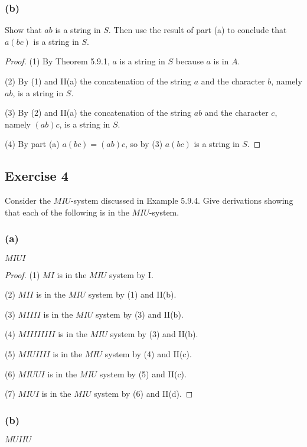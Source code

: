 \documentclass[14pt]{extarticle}
\begin{document}
\subsubsection{(b)}
Show that $ab$ is a string in $S$. Then use the result of part (a) to conclude that $a(bc)$ is a string in $S$.

\begin{proof}
    (1) By Theorem 5.9.1, $a$ is a string in $S$ because $a$ is in $A$.

    (2) By (1) and II(a) the concatenation of the string $a$ and the character $b$, namely $ab$, is a string in $S$.

    (3) By (2) and II(a) the concatenation of the string $ab$ and the character $c$, namely $(ab)c$, is a string in $S$.

    (4) By part (a) $a(bc) = (ab)c$, so by (3) $a(bc)$ is a string in $S$.
\end{proof}

\subsection{Exercise 4}
Consider the $M I U$-system discussed in Example 5.9.4. Give derivations showing that each of the following is in the $M I U$-system.

\subsubsection{(a)}
$M I U I$

\begin{proof}
    (1) $M I$ is in the $M I U$ system by I.

    (2) $M I I$ is in the $M I U$ system by (1) and II(b).

    (3) $M I I I I$ is in the $M I U$ system by (3) and II(b).

    (4) $M I I I I I I I I$ is in the $M I U$ system by (3) and II(b).

    (5) $M I U I I I I$ is in the $M I U$ system by (4) and II(c).

    (6) $M I U U I$ is in the $M I U$ system by (5) and II(c).

    (7) $M I U I$ is in the $M I U$ system by (6) and II(d).
\end{proof}

\subsubsection{(b)}
$M U I I U$
\end{document}
